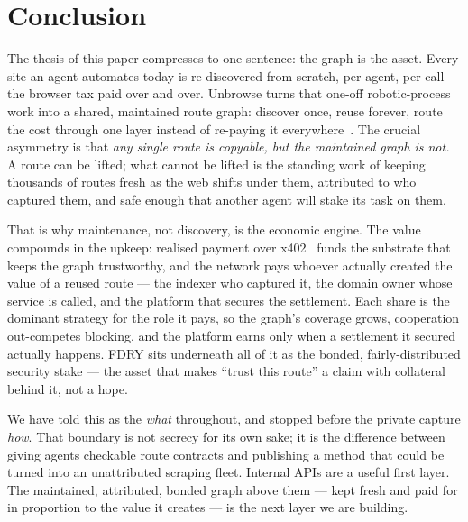 \documentclass[11pt]{article}
\begin{document}
\section{Conclusion}

The thesis of this paper compresses to one sentence: the graph is the asset. Every
site an agent automates today is re-discovered from scratch, per agent, per call ---
the browser tax paid over and over. Unbrowse turns that one-off robotic-process work
into a shared, maintained route graph: discover once, reuse forever, route the cost
through one layer instead of re-paying it everywhere~\cite{wedge}. The crucial
asymmetry is that \emph{any single route is copyable, but the maintained graph is
not.} A route can be lifted; what cannot be lifted is the standing work of keeping
thousands of routes fresh as the web shifts under them, attributed to who captured
them, and safe enough that another agent will stake its task on them.

That is why maintenance, not discovery, is the economic engine. The value compounds
in the upkeep: realised payment over x402~\cite{x402} funds the substrate that keeps
the graph trustworthy, and the network pays whoever actually created the value of a
reused route --- the indexer who captured it, the domain owner whose service is
called, and the platform that secures the settlement. Each share is the dominant
strategy for the role it pays, so the graph's coverage grows, cooperation
out-competes blocking, and the platform earns only when a settlement it secured
actually happens. FDRY sits underneath all of it as the bonded, fairly-distributed
security stake --- the asset that makes ``trust this route'' a claim with collateral
behind it, not a hope.

We have told this as the \emph{what} throughout, and stopped before the private
capture \emph{how}. That boundary is not secrecy for its own sake; it is the
difference between giving agents checkable route contracts and publishing a method
that could be turned into an unattributed scraping fleet. Internal APIs are a useful
first layer. The maintained, attributed, bonded graph above them --- kept fresh and
paid for in proportion to the value it creates --- is the next layer we are building.
\end{document}
